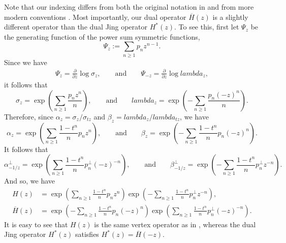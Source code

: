 \documentclass[12pt]{amsart}%
\def\lambda{lambda}%
\def\delta{delta}%
\newtheorem{proposition}[theorem]{Proposition}
\theoremstyle{remark}
\theoremstyle{definition}
\begin{document}
    Note that our indexing differs from both the original notation in \cite{jing:1991b} and from more modern conventions \cite{jing-liu:2022}. Most importantly, our dual operator $\overline{H}(z)$ is a slightly different operator than the dual Jing operator $H^*(z)$. To see this, first let $\Psi_z$ be the generating function of the power sum symmetric functions,
    \[\Psi_z:=\sum_{n\geq1}p_nz^{n-1}.\]
    Since we have
    \begin{align*}
        \Psi_z=\frac{\partial}{\partial z}\log \sigma_z,\qquad\text{and}\qquad \Psi_{-z}=\frac{\partial}{\partial z}\log \lambda_z,
    \end{align*}
    it follows that
    \[\sigma_z=\exp\left(\sum_{n\geq1}\frac{p_nz^n}{n}\right),\qquad\text{and}\qquad\lambda_z=\exp\left(-\sum_{n\geq1}\frac{p_n(-z)^n}{n}\right).\]
    Therefore, since $\alpha_z=\sigma_z/\sigma_{tz}$ and $\beta_z=\lambda_z/\lambda_{tz}$, we have
    \[\alpha_z=\exp\left(\sum_{n\geq1}\frac{1-t^n}{n}p_nz^n\right),\qquad\text{and}\qquad \beta_z=\exp\left(-\sum_{n\geq1}\frac{1-t^n}{n}p_n(-z)^n\right).\]
    It follows that
    \[\alpha_{-1/z}^\perp=\exp\left(\sum_{n\geq1}\frac{1-t^n}{n}p_n^\perp (-z)^{-n}\right),\qquad\text{and}\qquad \beta_{-1/z}^\perp=\exp\left(-\sum_{n\geq1}\frac{1-t^n}{n}p_n^\perp z^{-n}\right).\]
    And so, we have 
    \begin{align*}
        H(z)&=\exp\left(\sum_{n\geq1}\frac{1-t^n}{n}p_nz^n\right)\exp\left(-\sum_{n\geq1}\frac{1-t^n}{n}p_n^\perp z^{-n}\right),\\
        \overline{H}(z)&=\exp\left(-\sum_{n\geq1}\frac{1-t^n}{n}p_n(-z)^n\right) \exp\left(\sum_{n\geq1}\frac{1-t^n}{n}p_n^\perp (-z)^{-n}\right).
    \end{align*}
    It is easy to see that $H(z)$ is the same vertex operator as in \cite{jing-liu:2022}, whereas the dual Jing operator $H^*(z)$ satisfies $H^*(z)=\overline{H}(-z)$. 
    
    
    

\end{document}
